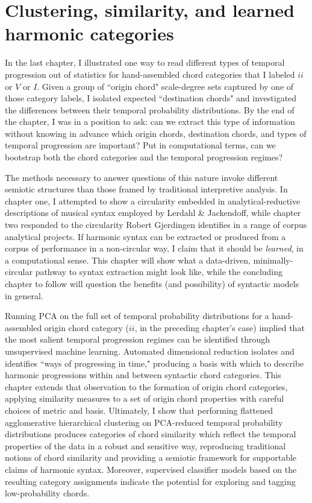 \chapter{Clustering, similarity, and learned harmonic categories}
In the last chapter, I illustrated one way to read different types of temporal progression out of statistics for hand-assembled chord categories that I labeled $ii$ or $V$ or $I$.  Given a group of ``origin chord" scale-degree sets captured by one of those category labels, I isolated expected ``destination chords" and investigated the differences between their temporal probability distributions.  By the end of the chapter, I was in a position to ask: can we extract this type of information without knowing in advance which origin chords, destination chords, and types of temporal progression are important?  Put in computational terms, can we bootstrap both the chord categories and the temporal progression regimes?

The methods necessary to answer questions of this nature invoke different semiotic structures than those framed by traditional interpretive analysis.  In chapter one, I attempted to show a circularity embedded in analytical-reductive descriptions of musical syntax employed by Lerdahl \& Jackendoff, while chapter two responded to the circularity Robert Gjerdingen identifies in a range of corpus analytical projects.  If harmonic syntax can be extracted or produced from a corpus of performance in a non-circular way, I claim that it should be \emph{learned}, in a computational sense.  This chapter will show what a data-driven, minimally-circular pathway to syntax extraction might look like, while the concluding chapter to follow will question the benefits (and possibility) of syntactic models in general.

Running PCA on the full set of temporal probability distributions for a hand-assembled origin chord category ($ii$, in the preceding chapter's case) implied that the most salient temporal progression regimes can be identified through unsupervised machine learning.  Automated dimensional reduction isolates and identifies ``ways of progressing in time," producing a basis with which to describe harmonic progressions within and between syntactic chord categories.  This chapter extends that observation to the formation of origin chord categories, applying similarity measures to a set of origin chord properties with careful choices of metric and basis.  Ultimately, I show that performing flattened agglomerative hierarchical clustering on PCA-reduced temporal probability distributions produces categories of chord similarity which reflect the temporal properties of the data in a robust and sensitive way, reproducing traditional notions of chord similarity and providing a semiotic framework for supportable claims of harmonic syntax.  Moreover, supervised classifier models based on the resulting category assignments indicate the potential for exploring and tagging low-probability chords.

